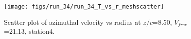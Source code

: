 \begin{figure}[H]
\centering
\texttt{[image: figs/run\_34/run\_34\_T\_vs\_r\_meshscatter]}
\caption{Scatter plot of azimuthal velocity vs radius at $z/c$=8.50, $V_{free}$=21.13, station4.}
\label{fig:run_34_T_vs_r_meshscatter}
\end{figure}


